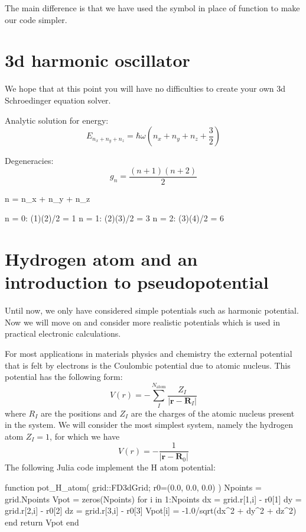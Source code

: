 The main difference is that we have used the symbol  in place
of  function to make our code simpler.


\section{3d harmonic oscillator}

We hope that at this point you will have no difficulties to create your own
3d Schroedinger equation solver.

Analytic solution for energy:
\begin{equation}
E_{n_{x} + n_{y} + n_{z}} = \hbar \omega \left( n_{x} + n_{y} + n_{z} + \frac{3}{2} \right)
\end{equation}

Degeneracies:
\begin{equation}
g_{n} = \frac{(n + 1)(n + 2)}{2}
\end{equation}

\begin{textcode}
n = n_x + n_y + n_z

n = 0: (1)(2)/2 = 1
n = 1: (2)(3)/2 = 3
n = 2: (3)(4)/2 = 6
\end{textcode}


\section{Hydrogen atom and an introduction to pseudopotential}

Until now, we only have considered simple potentials such as harmonic potential. Now we will
move on and consider more realistic potentials which is used in practical electronic calculations.

For most applications in materials physics and chemistry the external potential that is
felt by electrons is the Coulombic potential due to atomic nucleus. This potential has
the following form:
\begin{equation}
V(r) = -\sum_{I}^{N_{\mathrm{atom}}} \frac{Z_{I}}{\left|\mathbf{r} - \mathbf{R}_{I}\right|}
\end{equation}
where $R_{I}$ are the positions and $Z_{I}$ are the charges
of the atomic nucleus present in the system.
%
We will consider the most simplest system, namely the hydrogen atom $Z_{I}=1$, for which we have
\begin{equation}
V(r) = -\frac{1}{\left|\mathbf{r} - \mathbf{R}_{0}\right|}
\end{equation}
%
The following Julia code implement the H atom potential:
\begin{juliacode}
function pot_H_atom( grid::FD3dGrid; r0=(0.0, 0.0, 0.0) )
    Npoints = grid.Npoints
    Vpot = zeros(Npoints)
    for i in 1:Npoints
        dx = grid.r[1,i] - r0[1]
        dy = grid.r[2,i] - r0[2]
        dz = grid.r[3,i] - r0[3]
        Vpot[i] = -1.0/sqrt(dx^2 + dy^2 + dz^2)
    end
    return Vpot
end
\end{juliacode}


